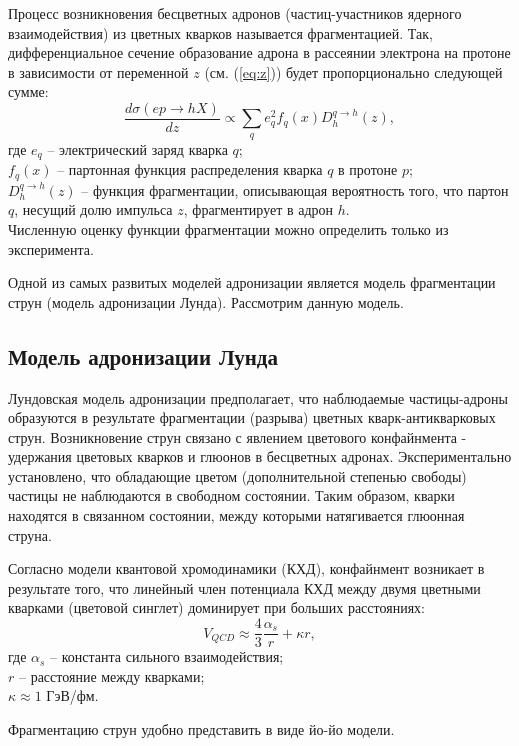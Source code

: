 \documentclass{extreport}
\begin{document}
Процесс возникновения бесцветных адронов (частиц-участников ядерного взаимодействия) из цветных кварков называется фрагментацией. Так, дифференциальное сечение образование адрона в рассеянии электрона на протоне в зависимости от переменной $z$ (см. (\ref{eq:z})) будет пропорционально следующей сумме:
\begin{equation}
	\frac{d\sigma(ep \rightarrow hX)}{dz} \propto \sum_q e_q^2 f_q (x) D_h^{q \rightarrow h}(z),
\end{equation}
где $e_q$ -- электрический заряд кварка $q$; \\ $f_q (x)$ -- партонная функция распределения кварка $q$ в протоне $p$; \\ $D_h^{q \rightarrow h}(z)$ -- функция фрагментации, описывающая вероятность того, что партон $q$, несущий долю импульса $z$, фрагментирует в адрон $h$. \\ Численную оценку функции фрагментации можно определить только из эксперимента.

Одной из самых развитых моделей адронизации является модель фрагментации струн (модель адронизации Лунда). Рассмотрим данную модель.
\subsection{Модель адронизации Лунда}
Лундовская модель адронизации предполагает, что наблюдаемые частицы-адроны образуются в результате фрагментации (разрыва) цветных кварк-антикварковых струн. Возникновение струн связано с явлением цветового конфайнмента - удержания цветовых кварков и глюонов в бесцветных адронах. Экспериментально установлено, что обладающие цветом (дополнительной степенью свободы) частицы не наблюдаются в свободном состоянии.  Таким образом, кварки находятся в связанном состоянии, между которыми натягивается глюонная струна. 

Согласно модели квантовой хромодинамики (КХД), конфайнмент возникает в результате того, что линейный член потенциала КХД между двумя цветными кварками (цветовой синглет) доминирует при больших расстояниях:
\begin{equation}
	V_{QCD}\approx \frac{4}{3} \frac{\alpha_s}{r} + \kappa r,
\end{equation}
где $\alpha_s$ -- константа сильного взаимодействия; \\ $r$ -- расстояние между кварками; \\ $\kappa \approx 1$ ГэВ/фм. 


Фрагментацию струн удобно представить в виде йо-йо модели. 
\end{document}
